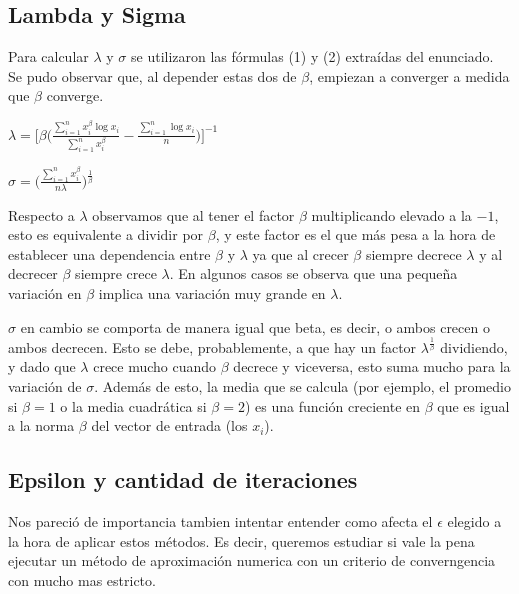 \subsection{Lambda y Sigma}

\indent Para calcular $\lambda$ y $\sigma$ se utilizaron las f\'ormulas 
(1) y (2) extra\'idas del enunciado. Se pudo observar que, al depender estas 
dos de $\beta$, empiezan a converger a medida que $\beta$ converge.
\begin{center}
$\lambda = \big[ \beta \big( \frac{\sum_{i=1}^{n}x_i^\beta \log x_i}{ \sum_{i=1}^{n} x_i^\beta} 
- \frac{\sum_{i=1}^{n} \log x_i}{n} \big)\big]^{-1}$

$\sigma = \big( \frac{\sum_{i=1}^{n} x_i^\beta}{n\lambda}\big)^{\frac{1}{\beta}}$
\end{center}

Respecto a $\lambda$ observamos que al tener el factor $\beta$ multiplicando 
elevado a la $-1$, esto es equivalente a dividir por $\beta$, y este factor es el 
que m\'as pesa a la hora de establecer una dependencia entre $\beta$ y $\lambda$ 
ya que al crecer $\beta$ siempre decrece $\lambda$ y al decrecer $\beta$ siempre
crece $\lambda$. En algunos casos se observa que una peque\~na variaci\'on en 
$\beta$ implica una variaci\'on muy grande en $\lambda$.

$\sigma$ en cambio se comporta de manera igual que beta, es decir, o ambos 
crecen o ambos decrecen. Esto se debe, probablemente, a que hay un factor 
$\lambda^{\frac{1}{\beta}}$ dividiendo, y dado que $\lambda$ crece mucho cuando 
$\beta$ decrece y viceversa, esto suma mucho para la variaci\'on de $\sigma$. 
Adem\'as de esto, la media que se calcula (por ejemplo, el promedio si $\beta = 
1$ o la media cuadr\'atica si $\beta = 2$) es una funci\'on creciente en 
$\beta$ que es igual a la norma $\beta$ del vector de entrada (los $x_i$).


\subsection{Epsilon y cantidad de iteraciones}

\indent Nos pareci\'o de importancia tambien intentar entender como afecta
el $\epsilon$ elegido a la hora de aplicar estos m\'etodos. Es decir,
queremos estudiar si vale la pena ejecutar un m\'etodo de aproximaci\'on numerica
con un criterio de converngencia con mucho mas estricto.

